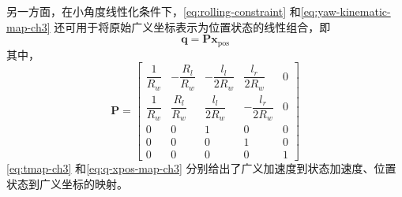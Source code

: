 另一方面，在小角度线性化条件下，\eqref{eq:rolling-constraint} 和\eqref{eq:yaw-kinematic-map-ch3} 还可用于将原始广义坐标表示为位置状态的线性组合，即
\begin{equation}
  \boldsymbol{q}
  =
  \boldsymbol{P}\boldsymbol{x}_{\mathrm{pos}}
  \label{eq:q-xpos-map-def-ch3}
\end{equation}
其中，
\begin{equation}
  \boldsymbol{P}
  =
  \begin{bmatrix}
    \dfrac{1}{R_w} & -\dfrac{R_l}{R_w} & -\dfrac{l_l}{2R_w} & \dfrac{l_r}{2R_w} & 0 \\
    \dfrac{1}{R_w} & \dfrac{R_l}{R_w} & \dfrac{l_l}{2R_w} & -\dfrac{l_r}{2R_w} & 0 \\
    0 & 0 & 1 & 0 & 0 \\
    0 & 0 & 0 & 1 & 0 \\
    0 & 0 & 0 & 0 & 1
  \end{bmatrix}
  \label{eq:q-xpos-map-ch3}
\end{equation}
\eqref{eq:tmap-ch3} 和\eqref{eq:q-xpos-map-ch3} 分别给出了广义加速度到状态加速度、位置状态到广义坐标的映射。

